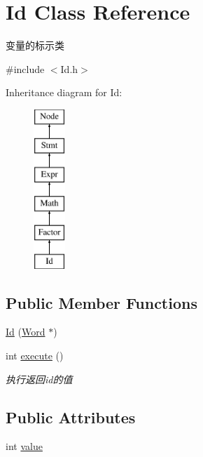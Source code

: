 \hypertarget{class_id}{}\section{Id Class Reference}
\label{class_id}


变量的标示类  




{\ttfamily \#include $<$Id.\+h$>$}

Inheritance diagram for Id\+:\begin{figure}[H]
\begin{center}
\leavevmode
\includegraphics[height=6.000000cm]{class_id}
\end{center}
\end{figure}
\subsection*{Public Member Functions}
\begin{DoxyCompactItemize}
\item 
\hyperlink{class_id_a22122a40c4a61b6d2f7d20a3cc7c7275}{Id} (\hyperlink{class_word}{Word} $\ast$)
\item 
\mbox{\label{class_id_ae43a9ffecbbc0ac4fd041b8e8e3c3de0}} 
int \hyperlink{class_id_ae43a9ffecbbc0ac4fd041b8e8e3c3de0}{execute} ()
\begin{DoxyCompactList}\small\item\em 执行返回id的值 \end{DoxyCompactList}\end{DoxyCompactItemize}
\subsection*{Public Attributes}
\begin{DoxyCompactItemize}
\item 
int \hyperlink{class_id_af7f7ed479b45ce150b88481b7b996e32}{value}
\end{DoxyCompactItemize}
